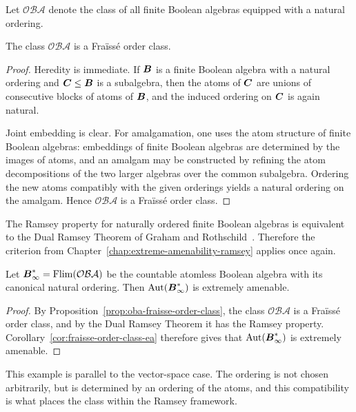 Let \(\mathcal{OBA}\) denote the class of all finite Boolean algebras equipped with a natural ordering.

\begin{proposition}
    \label{prop:oba-fraisse-order-class}
    The class \(\mathcal{OBA}\) is a Fraïssé order class.
\end{proposition}

\begin{proof}
    Heredity is immediate. If \(\boldsymbol{B}\) is a finite Boolean algebra with a natural ordering and \(\boldsymbol{C}\leq \boldsymbol{B}\) is a subalgebra, then the atoms of \(\boldsymbol{C}\) are unions of consecutive blocks of atoms of \(\boldsymbol{B}\), and the induced ordering on \(\boldsymbol{C}\) is again natural.

    Joint embedding is clear. For amalgamation, one uses the atom structure of finite Boolean algebras: embeddings of finite Boolean algebras are determined by the images of atoms, and an amalgam may be constructed by refining the atom decompositions of the two larger algebras over the common subalgebra. Ordering the new atoms compatibly with the given orderings yields a natural ordering on the amalgam. Hence \(\mathcal{OBA}\) is a Fraïssé order class.
\end{proof}

The Ramsey property for naturally ordered finite Boolean algebras is equivalent to the Dual Ramsey Theorem of Graham and Rothschild~\cite{GR}. Therefore the criterion from Chapter~\ref{chap:extreme-amenability-ramsey} applies once again.

\begin{theorem}
    \label{thm:ordered-boolean-algebra-ea}
    Let \(\boldsymbol{B}_\infty^{*}=\operatorname{Flim}(\mathcal{OBA})\) be the countable atomless Boolean algebra with its canonical natural ordering. Then \(\operatorname{Aut}(\boldsymbol{B}_\infty^{*})\) is extremely amenable.
\end{theorem}

\begin{proof}
    By Proposition~\ref{prop:oba-fraisse-order-class}, the class \(\mathcal{OBA}\) is a Fraïssé order class, and by the Dual Ramsey Theorem it has the Ramsey property. Corollary~\ref{cor:fraisse-order-class-ea} therefore gives that \(\operatorname{Aut}(\boldsymbol{B}_\infty^{*})\) is extremely amenable.
\end{proof}

This example is parallel to the vector-space case. The ordering is not chosen arbitrarily, but is determined by an ordering of the atoms, and this compatibility is what places the class within the Ramsey framework.

